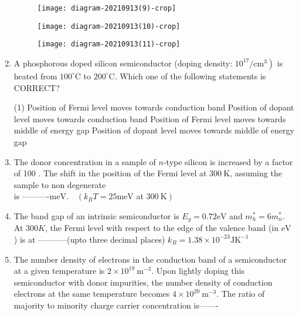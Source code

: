 \begin{enumerate}
\begin{tasks}
\task[\textbf{B.}] \begin{figure}[H]
	\centering
	\texttt{[image: diagram-20210913(9)-crop]}
\end{figure}
\task[\textbf{C.}] \begin{figure}[H]
	\centering
	\texttt{[image: diagram-20210913(10)-crop]}
\end{figure}
\task[\textbf{D.}] \begin{figure}[H]
	\centering
	\texttt{[image: diagram-20210913(11)-crop]}
\end{figure}
\end{tasks}
	\item A phosphorous doped silicon semiconductor (doping density: $\left.10^{17} / \mathrm{cm}^{3}\right)$ is heated from $100^{\circ} \mathrm{C}$ to $200^{\circ} \mathrm{C}$. Which one of the following statements is CORRECT?
{	}
\begin{tasks}(1)
\task[\textbf{A.}] Position of Fermi level moves towards conduction band
\task[\textbf{B.}] Position of dopant level moves towards conduction band
\task[\textbf{C.}] Position of Fermi level moves towards middle of energy gap
\task[\textbf{D.}] Position of dopant level moves towards middle of energy gap
\end{tasks}
	\item The donor concentration in a sample of $n$-type silicon is increased by a factor of 100 . The shift in the position of the Fermi level at $300 \mathrm{~K}$, assuming the sample to non degenerate\\ is ----------$\mathrm{meV} . \quad\left(k_{B} T=25 \mathrm{meV}\right.$ at $\left.300 \mathrm{~K}\right)$
{	}
	\item The band gap of an intrinsic semiconductor is $E_{g}=0.72 \mathrm{eV}$ and $m_{h}^{*}=6 m_{n}^{*} .$ At $300 K$, the Fermi level with respect to the edge of the valence band (in $\mathrm{eV}$ ) is at -----------(upto three decimal places) $k_{B}=1.38 \times 10^{-23} \mathrm{JK}^{-1}$
{	}
	\item The number density of electrons in the conduction band of a semiconductor at a given temperature is $2 \times 10^{19} \mathrm{~m}^{-3}$. Upon lightly doping this semiconductor with donor impurities, the number density of conduction electrons at the same temperature becomes $4 \times 10^{20} \mathrm{~m}^{-3} .$ The ratio of majority to minority charge carrier concentration is-------
{	}

\end{enumerate}
